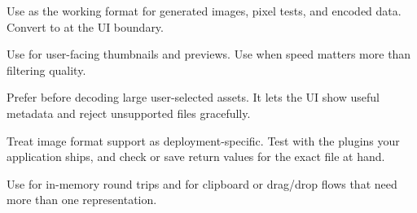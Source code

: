 Use  as the working format for generated images, pixel tests, and encoded data. Convert to  at the UI boundary.

Use  for user-facing thumbnails and previews. Use  when speed matters more than filtering quality.

Prefer  before decoding large user-selected assets. It lets the UI show useful metadata and reject unsupported files gracefully.

Treat image format support as deployment-specific. Test with the plugins your application ships, and check  or save return values for the exact file at hand.

Use  for in-memory round trips and  for clipboard or drag/drop flows that need more than one representation.
